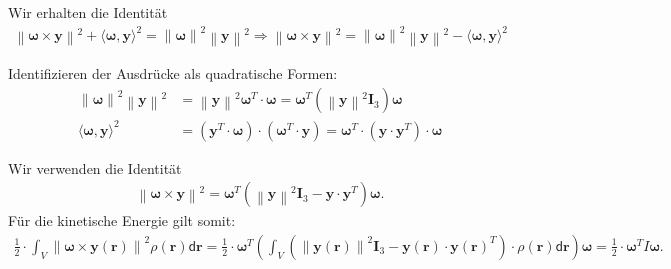 \documentclass[a4paper, 12pt]{scrartcl}
\newcommand{\norm}[1]{\left\lVert#1\right\lVert}
\begin{document}
\begin{beweis}
    Wir erhalten die Identität
    \begin{align*}
        \norm{\bm{\omega} \times \bm{y}}^2
        +
        \langle \bm{\omega} ,\bm{y}\rangle^2
        =
        \norm{\bm{\omega}}^2 \norm{\bm{y}}^2
        \Rightarrow
        \norm{\bm{\omega} \times \bm{y}}^2
        =
        \norm{\bm{\omega}}^2 \norm{\bm{y}}^2
        -
        \langle \bm{\omega} ,\bm{y}\rangle^2
    \end{align*}

    Identifizieren der Ausdrücke als quadratische Formen:
    \begin{align*}
        \norm{\bm{\omega}}^2 \norm{\bm{y}}^2
        &=
        \norm{\bm{y}}^2
        \bm{\omega}^T \cdot \bm{\omega}
        =
        \bm{\omega}^T \left(\norm{\bm{y}}^2 \bm{I}_3 \right) \bm{\omega}
        \\
        \langle \bm{\omega} ,\bm{y}\rangle^2
        &=
        (\bm{y}^T \cdot \bm{\omega}) \cdot (\bm{\omega}^T \cdot \bm{y})
        =
        \bm{\omega}^T \cdot \left(\bm{y} \cdot \bm{y}^T \right) \cdot \bm{\omega}
    \end{align*}

    Wir verwenden die Identität
    \begin{align*}
        \norm{\bm{\omega} \times \bm{y}}^2
        =
        \bm{\omega}^T 
        \left(
            \norm{\bm{y}}^2 \bm{I}_3 - \bm{y} \cdot \bm{y}^T
        \right)
        \bm{\omega}.
    \end{align*}
    Für die kinetische Energie gilt somit:
    \begin{align*}
        \frac{1}{2} \cdot 
        \int_{V} 
        \norm{\bm{\omega} \times \bm{y}(\bm{r})}^2
        \rho(\bm{r}) \mathsf{d}\bm{r}
        =
        \frac{1}{2} \cdot 
        \bm{\omega}^T 
        \left(
            \int_V
            \left(
                \norm{\bm{y}(\bm{r})}^2 \bm{I}_3 - \bm{y}(\bm{r}) \cdot \bm{y}(\bm{r})^T
            \right)
            \cdot
            \rho(\bm{r})
            \mathsf{d}\bm{r}
        \right)
        \bm{\omega}
        =
        \frac{1}{2} \cdot 
        \bm{\omega}^T I \bm{\omega}.
    \end{align*}
\end{beweis}
\end{document}
